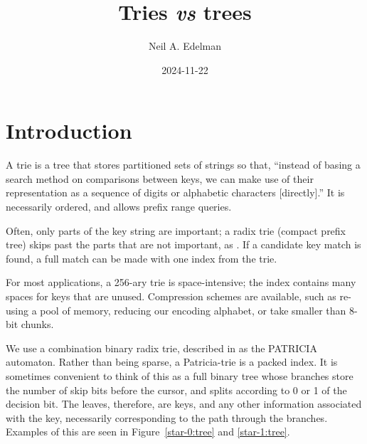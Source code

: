 \documentclass[14pt]{article}
\author{Neil A. Edelman}
\title{Tries {\it vs} trees}
\date{2024-11-22}
\begin{document}
\maketitle


\section{Introduction}

A trie is a tree that stores partitioned sets of strings\cite{de1959file, fredkin1960trie, jacquet1991analysis, askitis2011redesigning} so that, ``instead of basing a search method on comparisons between keys, we can make use of their representation as a sequence of digits or alphabetic characters [directly].\cite{knuth1997sorting}'' It is necessarily ordered, and allows prefix range queries.

Often, only parts of the key string are important; a radix trie (compact prefix tree) skips past the parts that are not important, as \cite{askitis2007hat}. If a candidate key match is found, a full match can be made with one index from the trie.

For most applications, a 256-ary trie is space-intensive; the index contains many spaces for keys that are unused. Compression schemes are available, such as re-using a pool of memory\cite{de1959file}, reducing our encoding alphabet, or take smaller than 8-bit chunks\cite{fredkin1960trie}.

We use a combination binary radix trie, described in \cite{morrison1968patricia} as the PATRICIA automaton. Rather than being sparse, a Patricia-trie is a packed index. It is sometimes convenient to think of this as a full binary tree whose branches store the number of skip bits before the cursor, and splits according to 0 or 1 of the decision bit. The leaves, therefore, are keys, and any other information associated with the key, necessarily corresponding to the path through the branches. Examples of this are seen in Figure~\ref{star-0:tree} and \ref{star-1:tree}.
\end{document}
